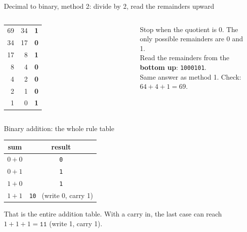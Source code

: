 \documentclass[aspectratio=169,10pt]{beamer}
\begin{document}
\begin{frame}{Decimal to binary, method 2: divide by 2, read the remainders upward}
\begin{columns}[c]
\begin{tabular}{r@{\ $\div2=$\ }r@{\ remainder\ }c}
69 & 34 & \textbf{1}\\
34 & 17 & \textbf{0}\\
17 & 8 & \textbf{1}\\
8 & 4 & \textbf{0}\\
4 & 2 & \textbf{0}\\
2 & 1 & \textbf{0}\\
1 & 0 & \textbf{1}
\end{tabular}
Stop when the quotient is 0. The only possible remainders are 0 and 1.\\[6pt]
Read the remainders from the \textbf{bottom up}: \texttt{1000101}.\\[6pt]
Same answer as method 1. Check: $64+4+1=69$.
\end{columns}
\end{frame}

\begin{frame}{Binary addition: the whole rule table}
\begin{center}
\begin{tabular}{c|c}
\textbf{sum} & \textbf{result}\\\hline
$0+0$ & \texttt{0}\\
$0+1$ & \texttt{1}\\
$1+0$ & \texttt{1}\\
$1+1$ & \texttt{10} \ (write 0, carry 1)
\end{tabular}
\end{center}
That is the entire addition table. With a carry in, the last case can reach $1+1+1=\texttt{11}$ (write 1, carry 1).
\end{frame}
\end{document}
